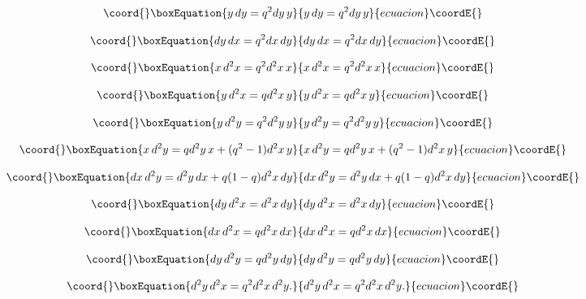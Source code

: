 \documentclass[a4paper,12pt,thmsa]{article}
\begin{document}
\begin{equation}\coord{}\boxEquation{
y\, dy=q^2dy\, y
}{
y\, dy=q^2dy\, y
}{ecuacion}\coordE{}\end{equation}

\begin{equation}\coord{}\boxEquation{
dy\, dx=q^2dx\, dy
}{
dy\, dx=q^2dx\, dy
}{ecuacion}\coordE{}\end{equation}

\begin{equation}\coord{}\boxEquation{
x\, d^2x=q^2d^2x\, x
}{
x\, d^2x=q^2d^2x\, x
}{ecuacion}\coordE{}\end{equation}

\begin{equation}\coord{}\boxEquation{
y\, d^2x=qd^2x\, y
}{
y\, d^2x=qd^2x\, y
}{ecuacion}\coordE{}\end{equation}

\begin{equation}\coord{}\boxEquation{
y\, d^2y=q^2d^2y\, y
}{
y\, d^2y=q^2d^2y\, y
}{ecuacion}\coordE{}\end{equation}

\begin{equation}\coord{}\boxEquation{
x\, d^2y=qd^2y\, x+(q^2-1)d^2x\, y
}{
x\, d^2y=qd^2y\, x+(q^2-1)d^2x\, y
}{ecuacion}\coordE{}\end{equation}

\begin{equation}\coord{}\boxEquation{
dx\, d^2y=d^2y\, dx+q(1-q)d^2x\, dy
}{
dx\, d^2y=d^2y\, dx+q(1-q)d^2x\, dy
}{ecuacion}\coordE{}\end{equation}

\begin{equation}\coord{}\boxEquation{
dy\, d^2x=d^2x\, dy
}{
dy\, d^2x=d^2x\, dy
}{ecuacion}\coordE{}\end{equation}

\begin{equation}\coord{}\boxEquation{
dx\, d^2x=qd^2x\, dx
}{
dx\, d^2x=qd^2x\, dx
}{ecuacion}\coordE{}\end{equation}

\begin{equation}\coord{}\boxEquation{
dy\, d^2y=qd^2y\, dy
}{
dy\, d^2y=qd^2y\, dy
}{ecuacion}\coordE{}\end{equation}

\begin{equation}\coord{}\boxEquation{
d^{2}y\, d^{2}x=q^{2}d^{2}x\, d^{2}y.
}{
d^{2}y\, d^{2}x=q^{2}d^{2}x\, d^{2}y.
}{ecuacion}\coordE{}\end{equation}
\end{document}

